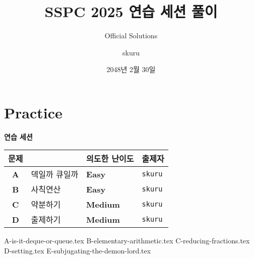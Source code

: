 
\usetikzlibrary{arrows.meta,matrix,decorations.pathreplacing}

\title{SSPC 2025 연습 세션 풀이}
\subtitle{Official Solutions}
\author{skuru}
\date{2048년 2월 30일}


\setcounter{framenumber}{-1}
\frame{\titlepage}

\section{Practice}
\begin{frame}
    {\huge {} \color{main-color} \textbf{연습 세션}}
    \vspace{3mm}
    \begin{center}
        \begin{tabular}{cl|l|l}
            \hline
            문제         &      & 의도한 난이도                         & 출제자            \\
            \hline
            \hline
            \textbf{A} & 덱일까 큐일까 & \textbf{\color{acbronze}Easy}   & \texttt{skuru} \\
            \textbf{B} & 사칙연산 & \textbf{\color{acbronze}Easy}   & \texttt{skuru} \\
            \textbf{C} & 약분하기 & \textbf{\color{acbronze}Medium}   & \texttt{skuru} \\
            \textbf{D} & 출제하기 & \textbf{\color{acgold}Medium} & \texttt{skuru} \\
            \hline
        \end{tabular}
    \end{center}
\end{frame}

{A-is-it-deque-or-queue.tex}
{B-elementary-arithmetic.tex}
{C-reducing-fractions.tex}
{D-setting.tex}
{E-subjugating-the-demon-lord.tex}

